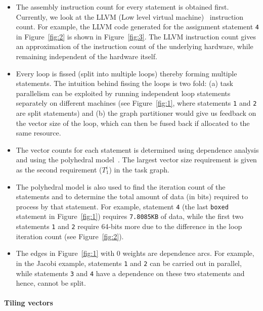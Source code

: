 \begin{itemize}

\item The assembly instruction count for every statement is obtained
  first. Currently, we look at the LLVM (Low level virtual
  machine)~\cite{clat04} instruction count. For example, the LLVM code
  generated for the assignment statement \texttt{4} in
  Figure~\ref{fig:2} is shown in Figure~\ref{fig:3}. The LLVM
  instruction count gives an approximation of the instruction count of
  the underlying hardware, while remaining independent of the hardware
  itself.

\item Every loop is fissed (split into multiple loops) thereby forming
  multiple statements. The intuition behind fissing the loops is two
  fold: (a) task parallelism can be exploited by running independent
  loop statements separately on different machines (see
  Figure~\ref{fig:1}, where statements \texttt{1} and \texttt{2} are
  split statements) and (b) the graph partitioner would give us feedback
  on the vector size of the loop, which can then be fused back if
  allocated to the same resource.

\item The vector counts for each statement is determined using
  dependence analysis and using the polyhedral model~\cite{mgri98}. The
  largest vector size requirement is given as the second requirement
  ($T^i_1$) in the task graph.

\item The polyhedral model is also used to find the iteration count of
  the statements and to determine the total amount of data (in bits)
  required to process by that statement. For example, statement
  \texttt{4} (the last \texttt{boxed} statement in Figure~\ref{fig:1})
  requires \texttt{7.8085KB} of data, while the first two statements
  \texttt{1} and \texttt{2} require 64-bits more due to the difference
  in the loop iteration count (see Figure~\ref{fig:2}).

\item The edges in Figure~\ref{fig:1} with 0 weights are dependence
  arcs. For example, in the Jacobi example, statements \texttt{1} and
  \texttt{2} can be carried out in parallel, while statements
  \texttt{3} and \texttt{4} have a dependence on these two statements
  and hence, cannot be split.

\end{itemize}

\paragraph{\textbf{Tiling vectors}}
\label{sec:tiling-vector-counts}


